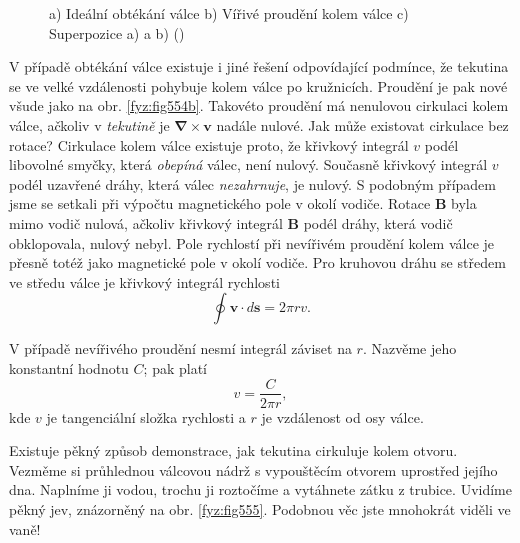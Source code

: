     \begin{figure}[ht!]
      \centering
      \caption{a) Ideální obtékání válce b) Vířivé proudění kolem válce c) Superpozice a) a b)
               (\cite[s.~752]{Feynman02})}
      \label{fyz:fig554}
    \end{figure}
    
    V případě obtékání válce existuje i jiné řešení odpovídající podmínce, že tekutina se ve velké 
    vzdálenosti pohybuje kolem válce po kružnicích. Proudění je pak nové všude jako na obr. 
    \ref{fyz:fig554b}. Takovéto proudění má nenulovou cirkulaci kolem válce, ačkoliv v 
    \emph{tekutině} je \(\symbf{\nabla}\times\bm{v}\) nadále nulové. Jak může existovat cirkulace 
    bez rotace? Cirkulace kolem válce existuje proto, že křivkový integrál \(v\) podél libovolné 
    smyčky, která \emph{obepíná} válec, není nulový. Současně křivkový integrál \(v\) podél 
    uzavřené dráhy, která válec \emph{nezahrnuje}, je nulový. S podobným případem jsme se setkali 
    při výpočtu magnetického pole v okolí vodiče. Rotace \(\bm{B}\) byla mimo vodič nulová, ačkoliv 
    křivkový integrál \(\bm{B}\) podél dráhy, která vodič obklopovala, nulový nebyl. Pole rychlostí 
    při nevířivém proudění kolem válce je přesně totéž jako magnetické pole v okolí vodiče. Pro 
    kruhovou dráhu se středem ve středu válce je křivkový integrál rychlosti
    \begin{equation*}
      \oint\bm{v}\cdot d\bm{s} = 2\pi r v.
    \end{equation*}
    
    V případě nevířivého proudění nesmí integrál záviset na \(r\). Nazvěme jeho konstantní hodnotu
    \(C\); pak platí
    \begin{equation}\label{fyz:eq566}
      v = \dfrac{C}{2\pi r},
    \end{equation}
    kde \(v\) je tangenciální složka rychlosti a \(r\) je vzdálenost od osy válce.
    
    Existuje pěkný způsob demonstrace, jak tekutina cirkuluje kolem otvoru. Vezměme si průhlednou 
    válcovou nádrž s vypouštěcím otvorem uprostřed jejího dna. Naplníme ji vodou, trochu ji 
    roztočíme a vytáhnete zátku z trubice. Uvidíme pěkný jev, znázorněný na obr. \ref{fyz:fig555}. 
    Podobnou věc jste mnohokrát viděli ve vaně!
    
